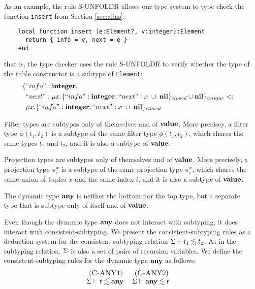 As an example, the rule \textsc{S-UNFOLDR} allows our type system to
type check the function \texttt{insert} from Section \ref{sec:alias}:
\begin{verbatim}
    local function insert (e:Element?, v:integer):Element
      return { info = v, next = e }
    end
\end{verbatim}
that is, the type checker uses the rule \textsc{S-UNFOLDR} to verify whether
the type of the table constructor is a subtype of \texttt{Element}:
\begin{align*}
\{ & ``info":\mathbf{integer}, \\
   & ``next":\mu x.\{``info":\mathbf{integer}, ``next":x \;\cup\; \mathbf{nil}\}_{closed} \cup \mathbf{nil} \}_{unique} <: \\
& \mu x.\{``info":\mathbf{integer}, ``next":x \;\cup\; \mathbf{nil}\}_{closed}
\end{align*}

Filter types are subtypes only of themselves and of $\mathbf{value}$.
More precisey, a filter type $\phi(t_{1},t_{2})$ is a subtype of
the same filter type $\phi(t_{1},t_{2})$, which shares the same
types $t_{1}$ and $t_{2}$, and it is also a subtype of $\mathbf{value}$.

Projection types are subtypes only of themselves and of $\mathbf{value}$.
More precisely, a projection type $\pi_{i}^{x}$ is a subtype of the
same projection type $\pi_{i}^{x}$, which shares the same union of
tuples $x$ and the same index $i$, and it is also a subtype of $\mathbf{value}$.

The dynamic type $\mathbf{any}$ is neither the bottom nor the top type,
but a separate type that is subtype only of itself and of $\mathbf{value}$.

Even though the dynamic type $\mathbf{any}$ does not interact with subtyping,
it does interact with consistent-subtyping.
We present the consistent-subtyping rules as a deduction system for
the consistent-subtyping relation $\Sigma \vdash t_{1} \lesssim t_{2}$.
As in the subtyping relation, $\Sigma$ is also a set of pairs of
recursion variables.
We define the consistent-subtyping rules for the dynamic type $\mathbf{any}$
as follows:
\[
\begin{array}{c}
\begin{array}{c}
\; (\textsc{C-ANY1})\\
\Sigma \vdash t \lesssim \mathbf{any}
\end{array}
\;
\begin{array}{c}
\; (\textsc{C-ANY2})\\
\Sigma \vdash \mathbf{any} \lesssim t
\end{array}
\end{array}
\]

